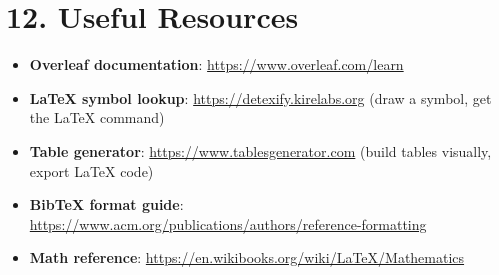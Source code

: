 \section*{12. Useful Resources}

\begin{itemize}
    \item \textbf{Overleaf documentation}: \url{https://www.overleaf.com/learn}
    \item \textbf{LaTeX symbol lookup}: \url{https://detexify.kirelabs.org}
          (draw a symbol, get the LaTeX command)
    \item \textbf{Table generator}: \url{https://www.tablesgenerator.com}
          (build tables visually, export LaTeX code)
    \item \textbf{BibTeX format guide}:
          \url{https://www.acm.org/publications/authors/reference-formatting}
    \item \textbf{Math reference}: \url{https://en.wikibooks.org/wiki/LaTeX/Mathematics}
\end{itemize}
